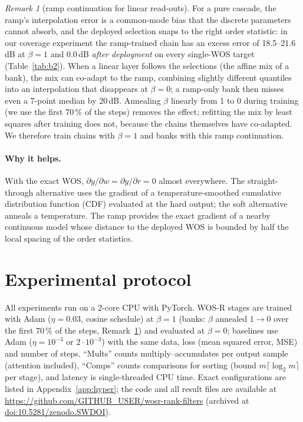 \documentclass[11pt,a4paper]{article}
\theoremstyle{definition}
\theoremstyle{remark}
\newtheorem{remark}[proposition]{Remark}
\newcommand{\ghrepo}{\url{https://github.com/GITHUB_USER/wosr-rank-filters}}
\newcommand{\swdoi}{10.5281/zenodo.SWDOI}
\begin{document}
\begin{remark}[ramp continuation for linear read-outs]\label{rem:cont}
For a pure cascade, the ramp's interpolation error is a common-mode bias that the discrete parameters cannot absorb, and
the deployed selection snaps to the right order statistic: in our coverage experiment the ramp-trained chain has an
excess error of 18.5--21.6\,dB at $\beta=1$ and 0.0\,dB \emph{after deployment} on every single-WOS target
(Table~\ref{tab:b2}). When a linear layer follows the selections (the affine mix of a bank), the mix can co-adapt to the
ramp, combining slightly different quantiles into an interpolation that disappears at $\beta=0$; a ramp-only bank then
misses even a 7-point median by 20\,dB. Annealing $\beta$ linearly from 1 to 0 during training (we use the first 70\,\% of
the steps) removes the effect; refitting the mix by least squares after training does not, because the chains
themselves have co-adapted. We therefore train chains with $\beta=1$ and banks with this ramp continuation.
\end{remark}

\paragraph{Why it helps.} With the exact WOS, $\partial y/\partial w=\partial y/\partial r=0$ almost everywhere. The
straight-through alternative uses the gradient of a temperature-smoothed cumulative distribution function (CDF) evaluated at the hard output; the soft
alternative anneals a temperature. The ramp provides the exact gradient of a nearby continuous model whose distance to
the deployed WOS is bounded by half the local spacing of the order statistics.

\section{Experimental protocol}\label{sec:proto}
All experiments run on a 2-core CPU with PyTorch. WOS-R stages are trained with Adam ($\eta=0.03$, cosine schedule) at
$\beta=1$ (banks: $\beta$ annealed $1\to0$ over the first 70\,\% of the steps, Remark~\ref{rem:cont}) and evaluated at
$\beta=0$; baselines use Adam ($\eta=10^{-3}$ or $2\cdot10^{-3}$) with the same data, loss
(mean squared error, MSE) and number of steps. ``Mults'' counts multiply--accumulates per output sample (attention included),
``Comps'' counts comparisons for sorting (bound $m\lceil\log_2m\rceil$ per stage), and latency is single-threaded CPU
time. Exact configurations are listed in Appendix~\ref{app:hyper}; the code and all result files are available at \ghrepo{} (archived at \href{https://doi.org/\swdoi}{doi:\swdoi}).
\end{document}
